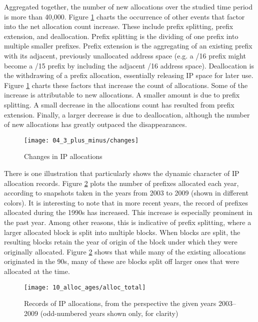 Aggregated together, the number of new allocations over the studied time period
is more than 40,000. Figure \ref{fig:IP allocations new and gone} charts the
occurrence of other events that factor into the net allocation count increase.
These include prefix splitting, prefix extension, and deallocation. Prefix
splitting is the dividing of one prefix into multiple smaller prefixes. Prefix
extension is the aggregating of an existing prefix with its adjacent,
previously unallocated address space (e.g. a /16 prefix might become a /15
prefix by including the adjacent /16 address space). Deallocation is the
withdrawing of a prefix allocation, essentially releasing IP space for later
use. Figure \ref{fig:IP allocations new and gone} charts these factors that
increase the count of allocations. Some of the increase is attributable to new
allocations. A smaller amount is due to prefix splitting. A small decrease in
the allocations count has resulted from prefix extension. Finally, a larger
decrease is due to deallocation, although the number of new allocations has
greatly outpaced the disappearances.

\begin{figure}[htbp]
    \centering
        \texttt{[image: 04\_3\_plus\_minus/changes]}
    \caption{Changes in IP allocations}
    \label{fig:IP allocations new and gone}
\end{figure}

There is one illustration that particularly shows the dynamic character of IP
allocation records. Figure \ref{fig:alloc ages total} plots the number of
prefixes allocated each year, according to snapshots taken in the years from
2003 to 2009 (shown in different colors). It is interesting to note that in
more recent years, the record of prefixes allocated during the 1990s has
increased. This increase is especially prominent in the past year. Among other
reasons, this is indicative of prefix splitting, where a larger allocated block
is split into multiple blocks. When blocks are split, the resulting blocks
retain the year of origin of the block under which they were originally
allocated. Figure \ref{fig:alloc ages total} shows that while many of the
existing allocations originated in the 90s, many of these are blocks split off
larger ones that were allocated at the time.

\begin{figure}[htbp]
	\centering
		\texttt{[image: 10\_alloc\_ages/alloc\_total]}
	\caption{Records of IP allocations, from the perspective the given years
		     2003--2009 (odd-numbered years shown only, for clarity)}
	\label{fig:alloc ages total}
\end{figure}


